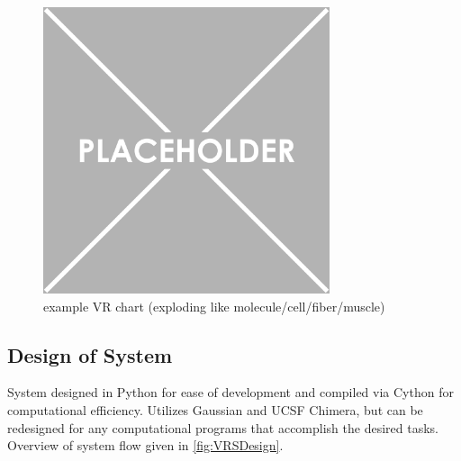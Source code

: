 \begin{figure}
	
	\centering
	
	\includegraphics[width=0.75\textwidth]{placeholder.png}
	
	\caption{example VR chart (exploding like molecule/cell/fiber/muscle)}
	
	\label{fig:variableResolutionSample}
		
\end{figure}

\subsection{Design of System}

System designed in Python for ease of development and compiled via Cython for computational efficiency. 
Utilizes Gaussian and UCSF Chimera, but can be redesigned for any computational programs that accomplish the desired tasks.
Overview of system flow given in \ref{fig:VRSDesign}.

